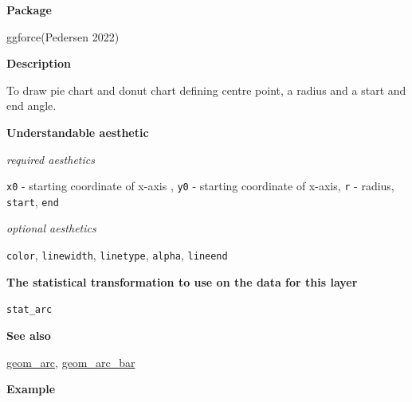\documentclass[
  letterpaper,
  DIV=11,
  numbers=noendperiod]{scrreprt}
\begin{document}
\textbf{Package}

ggforce(Pedersen 2022)

\textbf{Description}

To draw pie chart and donut chart defining centre point, a radius and a
start and end angle.

\textbf{Understandable aesthetic}

\emph{required aesthetics}

\texttt{x0} - starting coordinate of x-axis , \texttt{y0} - starting
coordinate of x-axis, \texttt{r} - radius, \texttt{start}, \texttt{end}

\emph{optional aesthetics}

\texttt{color}, \texttt{linewidth}, \texttt{linetype}, \texttt{alpha},
\texttt{lineend}

\textbf{The statistical transformation to use on the data for this
layer}

\texttt{stat\_arc}

\textbf{See also}

\hyperref[arc]{geom\_arc}, \hyperref[arcbar]{geom\_arc\_bar}

\textbf{Example}
\end{document}
